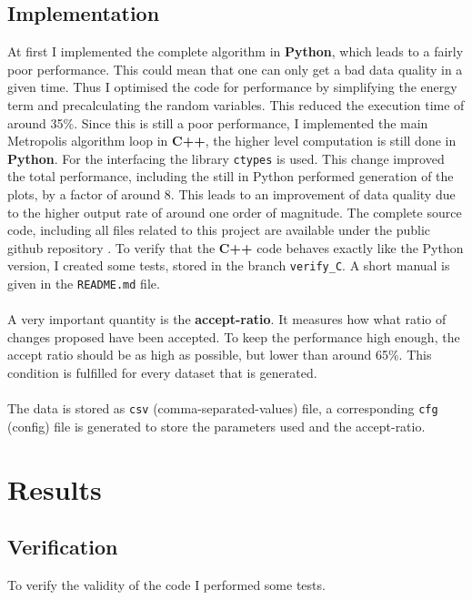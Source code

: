 \documentclass{scrartcl}
\begin{document}
	\subsection{Implementation}
		At first I implemented the complete algorithm in \textbf{Python}, which leads to a fairly poor performance.
		This could mean that one can only get a bad data quality in a given time.
		Thus I optimised the code for performance by simplifying the energy term and precalculating the random variables.
		This reduced the execution time of around 35\%.
		Since this is still a poor performance, I implemented the main Metropolis algorithm loop in \textbf{C++}, the higher level computation is still done in \textbf{Python}.
		For the interfacing the library \verb!ctypes! is used.
		This change improved the total performance, including the still in Python performed generation of the plots, by a factor of around 8.
		This leads to an improvement of data quality due to the higher output rate of around one order of magnitude.
		The complete source code, including all files related to this project are available under the public github repository \cite{github}.
		To verify that the \textbf{C++} code behaves exactly like the Python version, I created some tests, stored in the branch \verb!verify_C!.
		A short manual is given in the \verb!README.md! file.
		\\\\
		A very important quantity is the \textbf{accept-ratio}.
		It measures how what ratio of changes proposed have been accepted.
		To keep the performance high enough, the accept ratio should be as high as possible, but lower than around 65\%.
		This condition is fulfilled for every dataset that is generated.
		\\\\
		The data is stored as \verb!csv! (comma-separated-values) file, a corresponding \verb!cfg! (config) file is generated to store the parameters used and the accept-ratio.

	\section{Results}
	\subsection{Verification}
		To verify the validity of the code I performed some tests.
\end{document}
